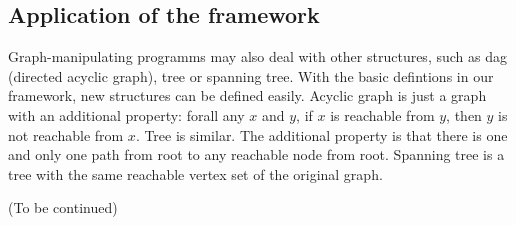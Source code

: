 \subsection{Application of the framework}

Graph-manipulating programms may also deal with other structures, such
as dag (directed acyclic graph), tree or spanning tree. With the basic
defintions in our framework, new structures can be defined
easily. Acyclic graph is just a graph with an additional property:
forall any $x$ and $y$, if $x$ is reachable from $y$, then $y$ is not
reachable from $x$. Tree is similar. The additional property is that
there is one and only one path from root to any reachable node from
root. Spanning tree is a tree with the same reachable vertex set of
the original graph.

(To be continued)
